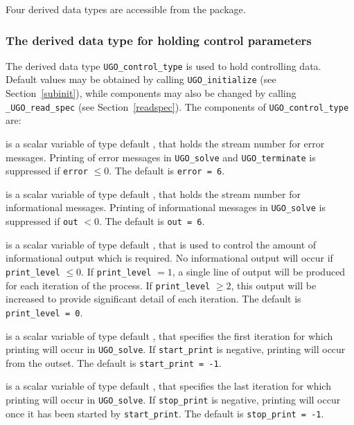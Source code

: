 \documentclass{galahad}
\newcommand{\packagename}{UGO}
\newcommand{\fullpackagename}{\libraryname\_\packagename}
\begin{document}
\galtypes
Four derived data types are accessible from the package.


\subsubsection{The derived data type for holding control
 parameters}\label{typecontrol}
The derived data type
{\tt \packagename\_control\_type}
is used to hold controlling data. Default values may be obtained by calling
{\tt \packagename\_initialize}
(see Section~\ref{subinit}),
while components may also be changed by calling
{\tt \fullpackagename\_read\-\_spec}
(see Section~\ref{readspec}).
The components of
{\tt \packagename\_control\_type}
are:

\begin{description}

 is a scalar variable of type default \integer, that holds the
stream number for error messages. Printing of error messages in
{\tt \packagename\_solve} and {\tt \packagename\_terminate}
is suppressed if {\tt error} $\leq 0$.
The default is {\tt error = 6}.

 is a scalar variable of type default \integer, that holds the
stream number for informational messages. Printing of informational messages in
{\tt \packagename\_solve} is suppressed if {\tt out} $< 0$.
The default is {\tt out = 6}.

 is a scalar variable of type default \integer, that is used
to control the amount of informational output which is required. No
informational output will occur if {\tt print\_level} $\leq 0$. If
{\tt print\_level} $= 1$, a single line of output will be produced for each
iteration of the process. If {\tt print\_level} $\geq 2$, this output will be
increased to provide significant detail of each iteration.
The default is {\tt print\_level = 0}.

 is a scalar variable of type default \integer, that specifies
the first iteration for which printing will occur in {\tt \packagename\_solve}.
If {\tt start\_print} is negative, printing will occur from the outset.
The default is {\tt start\_print = -1}.

 is a scalar variable of type default \integer, that specifies
the last iteration for which printing will occur in  {\tt \packagename\_solve}.
If {\tt stop\_print} is negative, printing will occur once it has been
started by {\tt start\_print}.
The default is {\tt stop\_print = -1}.


\end{description}
\end{document}
